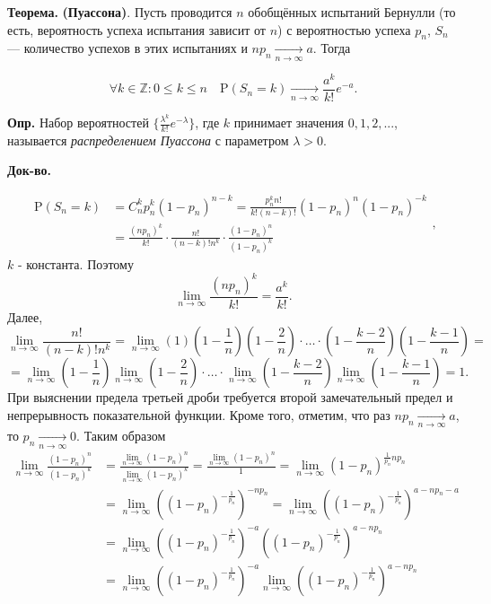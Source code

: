 \documentclass[oneside,final,14pt]{extreport}
\newcommand\mydef{{\bf Опр.}}
\newcommand\myth{{\bf Теорема.}}
\newcommand\myqed{{\bf Док-во.}}
\theoremstyle{definition}
\begin{document}
\myth {} \textbf{(Пуассона)}. Пусть проводится $n$ обобщённых испытаний Бернулли
(то есть, вероятность успеха испытания зависит от $n$) с вероятностью успеха
$p_n$, $S_n$ — количество успехов в этих испытаниях и $n p_{n} \underset{n \to \infty}{\longrightarrow} a$. Тогда

$$\forall k \in \mathbb{Z}: 0 \leqslant k \leqslant n \quad \mathrm{P}\left(S_{n}=k\right) \underset{n \to \infty}{\longrightarrow} \frac{a^{k}}{k !} e^{-a}.$$

\mydef{} Набор вероятностей $\{ \frac{\lambda^k}{k!} e^{-\lambda} \}$, где $k$ принимает значения $0, 1, 2, ...$, называется {\it распределением Пуассона} с параметром $\lambda > 0$.

\myqed{} 

$$\begin{aligned}
\mathrm{P}\left(S_{n}=k\right) &=C_{n}^{k} p_{n}^{k}\left(1-p_{n}\right)^{n-k}=\frac{p_{n}^{k} n !}{k !(n-k) !}\left(1-p_{n}\right)^{n}\left(1-p_{n}\right)^{-k} \\
&=\frac{\left(n p_{n}\right)^{k}}{k !} \cdot \frac{n !}{(n-k) ! n^{k}} \cdot \frac{\left(1-p_{n}\right)^{n}}{\left(1-p_{n}\right)^{k}}
\end{aligned},$$
$k$ - константа. Поэтому
$$\lim\limits_{n \to \infty} \frac{\left(n p_{n}\right)^{k}}{k !}=\frac{a^{k}}{k !}.$$
Далее,
$$\lim _{n \to \infty} \frac{n !}{(n-k) ! n^{k}}=\lim _{n \to \infty}(1)\left(1-\frac{1}{n}\right)\left(1-\frac{2}{n}\right) \cdot \ldots \cdot\left(1-\frac{k-2}{n}\right)\left(1-\frac{k-1}{n}\right) =$$
$$=\lim _{n \to \infty}\left(1-\frac{1}{n}\right) \lim _{n \to \infty}\left(1-\frac{2}{n}\right) \cdot \ldots \cdot \lim _{n \to \infty}\left(1-\frac{k-2}{n}\right) \lim _{n \to \infty}\left(1-\frac{k-1}{n}\right)=1.$$
При выяснении предела третьей дроби требуется второй замечательный предел и
непрерывность показательной функции. Кроме того, отметим, что раз $n p_{n} \underset{n \to \infty}{\longrightarrow} a$, то $p_{n} \underset{n \to \infty}{\longrightarrow} 0$. Таким образом
$$\begin{aligned}
\lim _{n \to \infty} \frac{\left(1-p_{n}\right)^{n}}{\left(1-p_{n}\right)^{k}} &=\frac{\lim _{n \to \infty}\left(1-p_{n}\right)^{n}}{\lim _{n \to \infty}\left(1-p_{n}\right)^{k}}=\frac{\lim _{n \to \infty}\left(1-p_{n}\right)^{n}}{1}=\lim _{n \to \infty}\left(1-p_{n}\right)^{\frac{1}{p_{n}} n p_{n}} \\
&=\lim _{n \to \infty}\left(\left(1-p_{n}\right)^{-\frac{1}{p_{n}}}\right)^{-n p_{n}}=\lim _{n \to \infty}\left(\left(1-p_{n}\right)^{-\frac{1}{p_{n}}}\right)^{a-n p_{n}-a} \\
&=\lim _{n \to \infty}\left(\left(1-p_{n}\right)^{-\frac{1}{p_{n}}}\right)^{-a}\left(\left(1-p_{n}\right)^{-\frac{1}{p_{n}}}\right)^{a-n p_{n}} \\
&=\lim _{n \to \infty}\left(\left(1-p_{n}\right)^{-\frac{1}{p_{n}}}\right)^{-a} \lim _{n \to \infty}\left(\left(1-p_{n}\right)^{-\frac{1}{p_{n}}}\right)^{a-n p_{n}}
\end{aligned}$$
\end{document}
